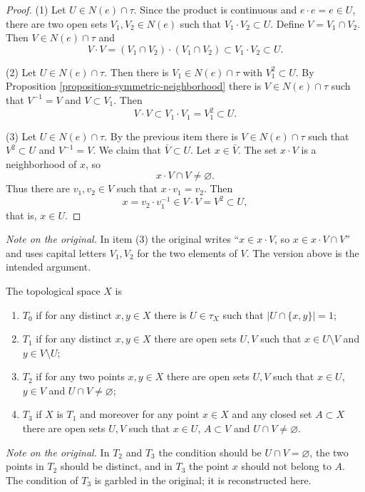 \begin{proof}
(1) Let $U\in N(e)\cap\tau$. Since the
product is continuous and
$e\cdot e=e\in U$, there are two open
sets $V_1,V_2\in N(e)$ such that
$V_1\cdot V_2\subset U$. Define
$V=V_1\cap V_2$. Then
$V\in N(e)\cap\tau$ and
$$
V\cdot V
=(V_1\cap V_2)\cdot(V_1\cap V_2)
\subset V_1\cdot V_2\subset U.
$$

(2) Let $U\in N(e)\cap\tau$. Then there
is $V_1\in N(e)\cap\tau$ with
$V_1^2\subset U$. By
Proposition
\ref{proposition-symmetric-neighborhood}
there is $V\in N(e)\cap\tau$ such that
$V^{-1}=V$ and $V\subset V_1$. Then
$$
V\cdot V\subset V_1\cdot V_1
=V_1^2\subset U.
$$

(3) Let $U\in N(e)\cap\tau$. By the
previous item there is
$V\in N(e)\cap\tau$ such that
$V^2\subset U$ and $V^{-1}=V$. We claim
that $\bar{V}\subset U$. Let
$x\in\bar{V}$. The set $x\cdot V$ is a
neighborhood of $x$, so
$$
x\cdot V\cap V\neq\varnothing.
$$
Thus there are $v_1,v_2\in V$ such that
$x\cdot v_1=v_2$. Then
$$
x=v_2\cdot v_1^{-1}
\in V\cdot V=V^2\subset U,
$$
that is, $x\in U$.
\end{proof}

\noindent
{\it Note on the original.} In item (3)
the original writes ``$x\in x\cdot V$,
so $x\in x\cdot V\cap V$'' and uses
capital letters $V_1,V_2$ for the two
elements of $V$. The version above is
the intended argument.

\begin{definition}
\label{definition-separation-axioms}
The topological space $X$ is
\begin{enumerate}
\item {\it $T_0$} if for any distinct
$x,y\in X$ there is $U\in\tau_X$ such
that $|U\cap\{x,y\}|=1$;
\item {\it $T_1$} if for any distinct
$x,y\in X$ there are open sets $U,V$
such that $x\in U\setminus V$ and
$y\in V\setminus U$;
\item {\it $T_2$} if for any two points
$x,y\in X$ there are open sets $U,V$
such that $x\in U$, $y\in V$ and
$U\cap V\neq\varnothing$;
\item {\it $T_3$} if $X$ is $T_1$ and
moreover for any point $x\in X$ and any
closed set $A\subset X$ there are open
sets $U,V$ such that $x\in U$,
$A\subset V$ and
$U\cap V\neq\varnothing$.
\end{enumerate}
\end{definition}

\noindent
{\it Note on the original.} In $T_2$ and
$T_3$ the condition should be
$U\cap V=\varnothing$, the two points in
$T_2$ should be distinct, and in $T_3$
the point $x$ should not belong to $A$.
The condition of $T_3$ is garbled in the
original; it is reconstructed here.


